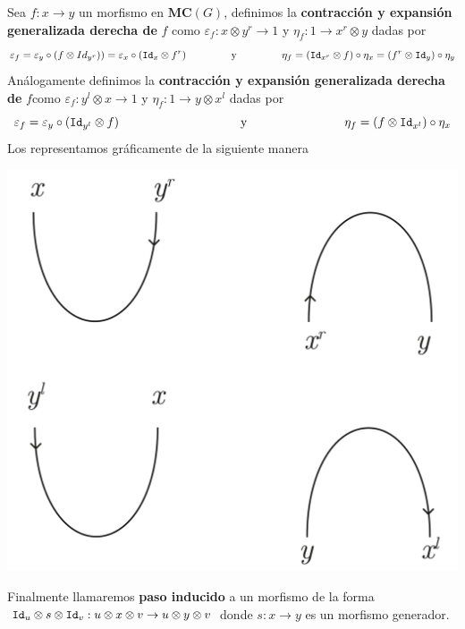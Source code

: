 \documentclass[../main.tex]{subfiles}
\begin{document}
    \begin{dfn}
        Sea $f:x \to y$ un morfismo en $\textbf{MC}(G)$, definimos la \textbf{contracción y expansión generalizada derecha de} $f$ como $\varepsilon_f : x \otimes y^r \to 1$ y $\eta_f : 1 \to x^r \otimes y$ dadas por 
        $$\varepsilon_f =\varepsilon_y \circ (f \otimes Id_{y^r}))= \varepsilon_x \circ (\texttt{Id}_x \otimes f^r) \qquad \qquad \text{ y } \qquad \qquad \eta_f=(\texttt{Id}_{x^r} \otimes f)\circ \eta_x = (f^r \otimes \texttt{Id}_y)\circ \eta_y$$ 
        Análogamente definimos la \textbf{contracción y expansión generalizada derecha de} $f$como $\varepsilon_f : y^l \otimes x \to 1$ y $\eta_f : 1 \to y \otimes x^l$ dadas por 
        $$\varepsilon_f = \varepsilon_y \circ (\texttt{Id}_{y^l}\otimes f) \qquad \qquad \qquad \qquad \text{\hspace{.7cm}y} \qquad \qquad \qquad \qquad \eta_f =(f \otimes \texttt{Id}_{x^l}) \circ \eta_x$$
        Los representamos gráficamente de la siguiente manera
        \begin{center}
        \includegraphics[scale=.2]{TeX/diagrama/5-7.pdf}
        \end{center}
        Finalmente llamaremos \textbf{paso inducido} a un morfismo de la forma $\texttt{Id}_u \otimes s \otimes \texttt{Id}_v : u \otimes x \otimes v \to u \otimes y \otimes v$ donde $s: x \to y$ es un morfismo generador. 
    \end{dfn}
    

    
    
\end{document}
